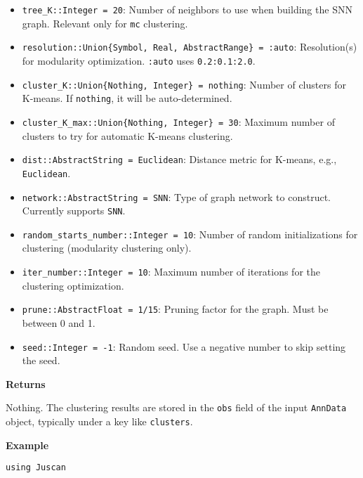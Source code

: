 \documentclass[oneside]{memoir}
\begin{document}
\begin{adjustwidth}{2em}{0pt}
\begin{itemize}
\item \texttt{tree\_K::Integer = 20}: Number of neighbors to use when building the SNN graph. Relevant only for \texttt{{\textquotedbl}mc{\textquotedbl}} clustering.


\item \texttt{resolution::Union\{Symbol, Real, AbstractRange\} = :auto}: Resolution(s) for modularity optimization. \texttt{:auto} uses \texttt{0.2:0.1:2.0}.


\item \texttt{cluster\_K::Union\{Nothing, Integer\} = nothing}: Number of clusters for K-means. If \texttt{nothing}, it will be auto-determined.


\item \texttt{cluster\_K\_max::Union\{Nothing, Integer\} = 30}: Maximum number of clusters to try for automatic K-means clustering.


\item \texttt{dist::AbstractString = {\textquotedbl}Euclidean{\textquotedbl}}: Distance metric for K-means, e.g., \texttt{{\textquotedbl}Euclidean{\textquotedbl}}.


\item \texttt{network::AbstractString = {\textquotedbl}SNN{\textquotedbl}}: Type of graph network to construct. Currently supports \texttt{{\textquotedbl}SNN{\textquotedbl}}.


\item \texttt{random\_starts\_number::Integer = 10}: Number of random initializations for clustering (modularity clustering only).


\item \texttt{iter\_number::Integer = 10}: Maximum number of iterations for the clustering optimization.


\item \texttt{prune::AbstractFloat = 1/15}: Pruning factor for the graph. Must be between 0 and 1.


\item \texttt{seed::Integer = -1}: Random seed. Use a negative number to skip setting the seed.

\end{itemize}
\textbf{Returns}

Nothing. The clustering results are stored in the \texttt{obs} field of the input \texttt{AnnData} object, typically under a key like \texttt{{\textquotedbl}clusters{\textquotedbl}}.

\textbf{Example}


\begin{verbatim}
using Juscan


\end{verbatim}
\end{adjustwidth}
\end{document}
